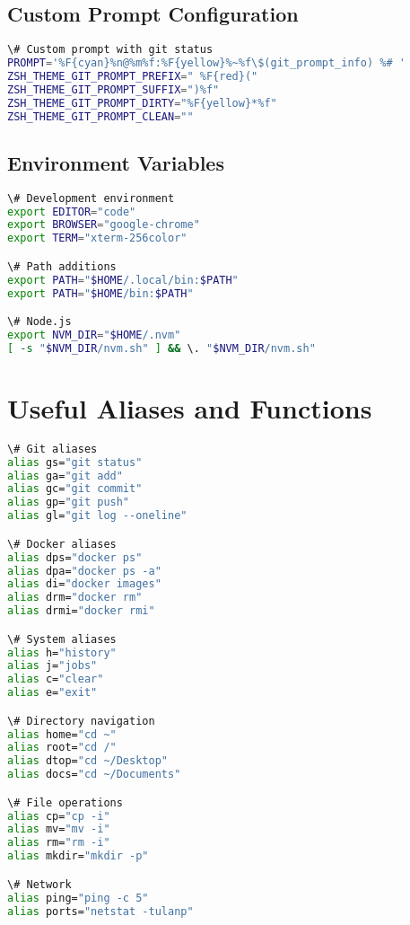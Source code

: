 \documentclass{article}
\begin{document}
\subsection{Custom Prompt Configuration}

\begin{lstlisting}[language=bash, caption=Custom prompt example]
\# Custom prompt with git status
PROMPT='%F{cyan}%n@%m%f:%F{yellow}%~%f\$(git_prompt_info) %# '
ZSH_THEME_GIT_PROMPT_PREFIX=" %F{red}("
ZSH_THEME_GIT_PROMPT_SUFFIX=")%f"
ZSH_THEME_GIT_PROMPT_DIRTY="%F{yellow}*%f"
ZSH_THEME_GIT_PROMPT_CLEAN=""
\end{lstlisting}

\subsection{Environment Variables}

\begin{lstlisting}[language=bash, caption=Environment setup]
\# Development environment
export EDITOR="code"
export BROWSER="google-chrome"
export TERM="xterm-256color"

\# Path additions
export PATH="$HOME/.local/bin:$PATH"
export PATH="$HOME/bin:$PATH"

\# Node.js
export NVM_DIR="$HOME/.nvm"
[ -s "$NVM_DIR/nvm.sh" ] && \. "$NVM_DIR/nvm.sh"
\end{lstlisting}

\section{Useful Aliases and Functions}

\begin{lstlisting}[language=bash, caption=Productivity aliases]
\# Git aliases
alias gs="git status"
alias ga="git add"
alias gc="git commit"
alias gp="git push"
alias gl="git log --oneline"

\# Docker aliases
alias dps="docker ps"
alias dpa="docker ps -a"
alias di="docker images"
alias drm="docker rm"
alias drmi="docker rmi"

\# System aliases
alias h="history"
alias j="jobs"
alias c="clear"
alias e="exit"

\# Directory navigation
alias home="cd ~"
alias root="cd /"
alias dtop="cd ~/Desktop"
alias docs="cd ~/Documents"

\# File operations
alias cp="cp -i"
alias mv="mv -i"
alias rm="rm -i"
alias mkdir="mkdir -p"

\# Network
alias ping="ping -c 5"
alias ports="netstat -tulanp"
\end{lstlisting}
\end{document}
